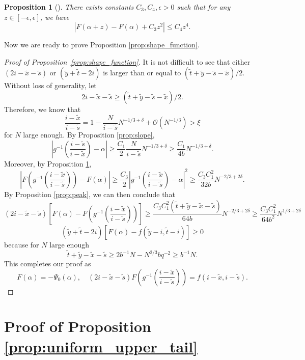 \documentclass[11pt]{article}
\newtheorem{proposition}[theorem]{Proposition}
\theoremstyle{definition}
\begin{document}
\begin{proposition}[{\cite[Proposition 3.4]{basu2024temporal}}]\label{prop:shape}
    There exists constants $C_3, C_4, \epsilon > 0$ such that for any $z \in [-\epsilon, \epsilon]$, we have
    \begin{equation}
        \left|F(\alpha + z) - F(\alpha) + C_3z^2 \right| \leq C_4z^4.
    \end{equation}
\end{proposition}


Now we are ready to prove Proposition \ref{prop:shape_function}.
\begin{proof}[Proof of Proposition~\ref{prop:shape_function}]
It is not difficult to see that either $(2i - \tilde{x} - \tilde{s})$ or $(\tilde{y} + \tilde{t}-2i)$ is larger than or equal to $(\tilde{t} + \tilde{y}- \tilde{s} - \tilde{x})/{2}$. Without loss of generality, let 
\[
2i - \tilde{x} - \tilde{s} \geq (\tilde{t} + \tilde{y}- \tilde{s} - \tilde{x})/{2}.
\]
Therefore, we know that 
\[
\frac{i-\tilde{x}}{i - \tilde{s}} = 1 - \frac{N}{i-\tilde{s}}N^{-1/3+\delta} + \mathcal{O}(N^{-1/3}) > \xi
\]
for $N$ large enough. By Proposition \ref{prop:slope}, 
\[
\left|g^{-1}\left(\frac{i-\tilde{s}}{i-\tilde{x}}\right) - \alpha \right| \geq \frac{C_1}{2}\frac{N}{i-\tilde{s}}N^{-1/3 + \delta} \geq \frac{C_1}{4b}N^{-1/3+\delta}.
\]
Moreover, by Proposition \ref{prop:shape},
\[
\left|F\left(g^{-1}\left(\frac{i-\tilde{x}}{i-\tilde{s}}\right)\right) - F(\alpha)\right| \geq \frac{C_3}{2}\left|g^{-1}\left(\frac{i-\tilde{x}}{i-\tilde{s}}\right) - \alpha \right|^2 \geq \frac{C_3C_1^2}{32b}
N^{-2/3 + 2\delta}.
\]
By Proposition \ref{prop:peak}, we can then conclude that
\[
(2i - \tilde{x} - \tilde{s})\left[ F(\alpha) -F\left(g^{-1}\left(\frac{i-\tilde{x}}{i-\tilde{s}}\right)\right) \right] \geq \frac{C_3C_1^2(\tilde{t} + \tilde{y} - \tilde{x} - \tilde{s})}{64b}
N^{-2/3 + 2\delta} \geq \frac{C_3C_1^2}{64b^2}
N^{1/3 + 2\delta}
\]
\[
(\tilde{y} + \tilde{t} - 2i)\left[F(\alpha)- f(\tilde{y} - i, \tilde{t} - i)\right] \geq 0
\]
because for $N$ large enough
\[
\tilde{t} + \tilde{y} - \tilde{x} - \tilde{s} \geq 2b^{-1}N - N^{2/3}bq^{-2} \geq b^{-1}N.
\]
This completes our proof as
\[
F(\alpha) = -\Psi_0(\alpha), \quad(2i - \tilde{x} - \tilde{s})F\left(g^{-1}\left(\frac{i-\tilde{x}}{i-\tilde{s}}\right)\right) = f(i-\tilde{x}, i - \tilde{s}).
\]

\end{proof}

\section{Proof of Proposition \ref{prop:uniform_upper_tail}}\label{sec:proof of prop}
\end{document}

